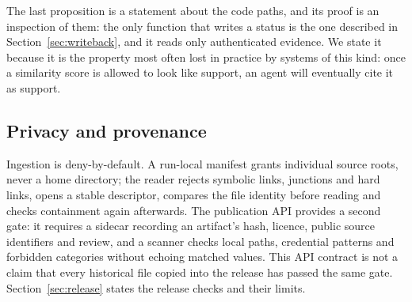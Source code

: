 The last proposition is a statement about the code paths, and its proof is an inspection of them: the only function that writes a status is the one described in Section~\ref{sec:writeback}, and it reads only authenticated evidence. We state it because it is the property most often lost in practice by systems of this kind: once a similarity score is allowed to look like support, an agent will eventually cite it as support.

\subsection{Privacy and provenance}
Ingestion is deny-by-default. A run-local manifest grants individual source roots, never a home directory; the reader rejects symbolic links, junctions and hard links, opens a stable descriptor, compares the file identity before reading and checks containment again afterwards. The publication API provides a second gate: it requires a sidecar recording an artifact's hash, licence, public source identifiers and review, and a scanner checks local paths, credential patterns and forbidden categories without echoing matched values. This API contract is not a claim that every historical file copied into the release has passed the same gate. Section~\ref{sec:release} states the release checks and their limits.
